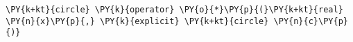 \begin{Verbatim}[commandchars=\\\{\}]
    \PY{k+kt}{circle} \PY{k}{operator} \PY{o}{*}\PY{p}{(}\PY{k+kt}{real} \PY{n}{x}\PY{p}{,} \PY{k}{explicit} \PY{k+kt}{circle} \PY{n}{c}\PY{p}{)}
\end{Verbatim}
